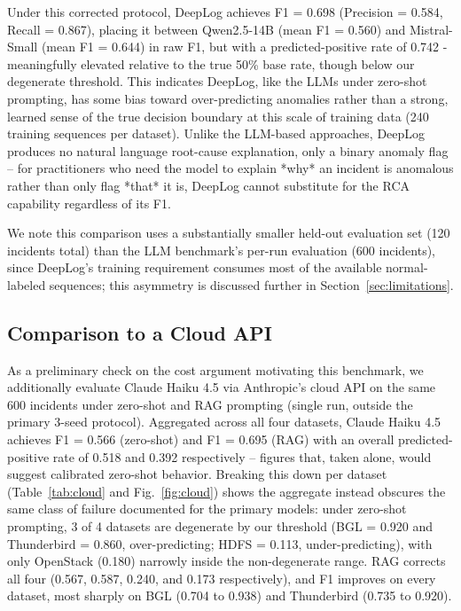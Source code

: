 \documentclass[10pt,conference]{IEEEtran}
\begin{document}
Under this corrected protocol, DeepLog achieves F1 = 0.698 (Precision =
0.584, Recall = 0.867), placing it between Qwen2.5-14B (mean F1 = 0.560)
and Mistral-Small (mean F1 = 0.644) in raw F1, but with a predicted-positive
rate of 0.742 - meaningfully elevated relative to the true 50\% base rate,
though below our degenerate threshold. This indicates DeepLog, like the
LLMs under zero-shot prompting, has some bias toward over-predicting
anomalies rather than a strong, learned sense of the true decision
boundary at this scale of training data (240 training sequences per
dataset). Unlike the LLM-based approaches, DeepLog produces no natural
language root-cause explanation, only a binary anomaly flag -- for
practitioners who need the model to explain *why* an incident is
anomalous rather than only flag *that* it is, DeepLog cannot substitute
for the RCA capability regardless of its F1.

We note this comparison uses a substantially smaller held-out evaluation
set (120 incidents total) than the LLM benchmark's per-run evaluation
(600 incidents), since DeepLog's training requirement consumes most of
the available normal-labeled sequences; this asymmetry is discussed
further in Section~\ref{sec:limitations}.

\subsection{Comparison to a Cloud API}
\label{sec:cloud}

As a preliminary check on the cost argument motivating this benchmark, we
additionally evaluate Claude Haiku 4.5 via Anthropic's cloud API on the
same 600 incidents under zero-shot and RAG prompting (single run, outside
the primary 3-seed protocol). Aggregated across all four datasets, Claude
Haiku 4.5 achieves F1 = 0.566 (zero-shot) and F1 = 0.695 (RAG) with an
overall predicted-positive rate of 0.518 and 0.392 respectively -- figures
that, taken alone, would suggest calibrated zero-shot behavior. Breaking
this down per dataset (Table~\ref{tab:cloud} and Fig.~\ref{fig:cloud})
shows the aggregate instead obscures the same class of failure documented
for the primary models: under zero-shot prompting, 3 of 4 datasets are
degenerate by our threshold (BGL = 0.920 and Thunderbird = 0.860,
over-predicting; HDFS = 0.113, under-predicting), with only OpenStack
(0.180) narrowly inside the non-degenerate range. RAG corrects all four
(0.567, 0.587, 0.240, and 0.173 respectively), and F1 improves on every
dataset, most sharply on BGL (0.704 to 0.938) and Thunderbird (0.735 to
0.920).
\end{document}
